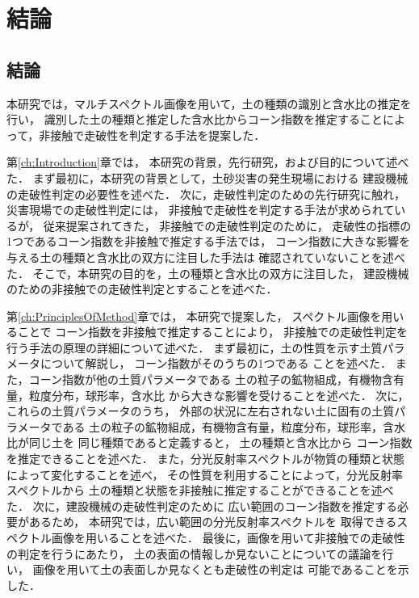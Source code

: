 \chapter{結論}
\thispagestyle{empty}
\label{ch:Conclusion}
\minitoc

\newpage
\section{結論}

本研究では，マルチスペクトル画像を用いて，土の種類の識別と含水比の推定を行い，
識別した土の種類と推定した含水比からコーン指数を推定することによって，非接触で走破性を判定する手法を提案した．

第\ref{ch:Introduction}章では，
本研究の背景，先行研究，および目的について述べた．
%
まず最初に，本研究の背景として，土砂災害の発生現場における
建設機械の走破性判定の必要性を述べた．
%
次に，走破性判定のための先行研究に触れ，
災害現場での走破性判定には，
非接触で走破性を判定する手法が求められているが，
従来提案されてきた，
非接触での走破性判定のために，
走破性の指標の1つであるコーン指数を非接触で推定する手法では，
コーン指数に大きな影響を与える土の種類と含水比の双方に注目した手法は
確認されていないことを述べた．
%
そこで，本研究の目的を，土の種類と含水比の双方に注目した，
建設機械のための非接触での走破性判定とすることを述べた．


第\ref{ch:PrinciplesOfMethod}章では，
本研究で提案した，
スペクトル画像を用いることで
コーン指数を非接触で推定することにより，
非接触での走破性判定を行う手法の原理の詳細について述べた．
%
まず最初に，土の性質を示す土質パラメータについて解説し，
コーン指数がそのうちの1つである
ことを述べた．
また，コーン指数が他の土質パラメータである
土の粒子の鉱物組成，有機物含有量，粒度分布，球形率，含水比
から大きな影響を受けることを述べた．
% 
次に，これらの土質パラメータのうち，
外部の状況に左右されない土に固有の土質パラメータである
土の粒子の鉱物組成，有機物含有量，粒度分布，球形率，含水比が同じ土を
同じ種類であると定義すると，
土の種類と含水比から
コーン指数を推定できることを述べた．
%
また，分光反射率スペクトルが物質の種類と状態によって変化することを述べ，
その性質を利用することによって，分光反射率スペクトルから
土の種類と状態を非接触に推定することができることを述べた．
%
次に，建設機械の走破性判定のために
広い範囲のコーン指数を推定する必要があるため，
本研究では，広い範囲の分光反射率スペクトルを
取得できるスペクトル画像を用いることを述べた．
%
最後に，画像を用いて非接触での走破性の判定を行うにあたり，
土の表面の情報しか見ないことについての議論を行い，
画像を用いて土の表面しか見なくとも走破性の判定は
可能であることを示した．

